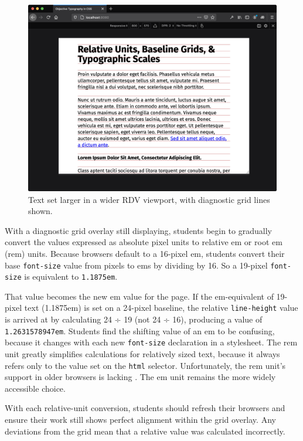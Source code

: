 \documentclass[sigplan,screen]{acmart}
\begin{document}
\begin{figure}
  \includegraphics[width=\linewidth]{rdv-wide}
  \caption{Text set larger in a wider RDV viewport, with diagnostic grid lines shown.}
  \label{fig:rdv-wide}
\end{figure}

With a diagnostic grid overlay still displaying, students begin to gradually convert the values expressed as absolute pixel units to relative em or root em (rem) units. Because browsers default to a 16-pixel em, students convert their base \verb|font-size| value from pixels to ems by dividing by 16. So a 19-pixel \verb|font-size| is equivalent to \verb|1.1875em|.

That value becomes the new em value for the page. If the em-equivalent of 19-pixel text (1.1875em) is set on a 24-pixel baseline, the relative \verb|line-height| value is arrived at by calculating 24 ÷ 19 (not 24 ÷ 16), producing a value of \verb|1.2631578947em|. Students find the shifting value of an em to be confusing, because it changes with each new \verb|font-size| declaration in a stylesheet. The rem unit greatly simplifies calculations for relatively sized text, because it always refers only to the value set on the \verb|html| selector. Unfortunately, the rem unit's support in older browsers is lacking \cite{ciu:rem}. The em unit remains the more widely accessible choice.

With each relative-unit conversion, students should refresh their browsers and ensure their work still shows perfect alignment within the  grid overlay. Any deviations from the grid mean that a relative value was calculated incorrectly.
\end{document}
